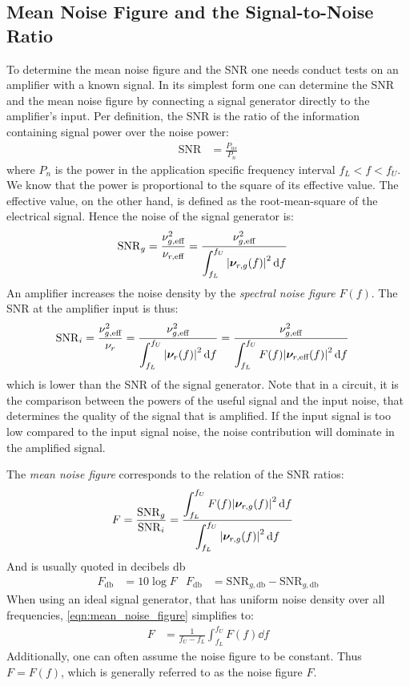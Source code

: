 \subsection{Mean Noise Figure and the Signal-to-Noise Ratio}
To determine the mean noise figure and the \acf{SNR} one needs conduct tests on an amplifier with a known signal. In its simplest form one can determine the \ac{SNR} and the mean noise figure by connecting a signal generator directly to the amplifier's input. Per definition, the \ac{SNR} is the ratio of the information containing signal power over the noise power:
\begin{align}
  \mathrm{SNR} &= \frac{P_{us}}{P_n}
\end{align}
where $P_n$ is the power in the application specific frequency interval $f_L<f<f_U$. We know that the power is proportional to the square of its effective value. The effective value, on the other hand, is defined as the root-mean-square of the electrical signal. Hence the noise of the signal generator is:
\begin{align}
  \mathrm{SNR}_g &= \frac{\nu_{g,\text{eff}}^2}{\nu_{r,\text{eff}}} = \frac{\nu_{g,\text{eff}}^2}{\displaystyle\int_{f_L}^{f_U} \abs{\bm{\nu}_{r,g}(f)}^2 \dd{f}} \label{eqn:snr_g}
\end{align}
An amplifier increases the noise density by the \emph{spectral noise figure} $F(f)$. The \ac{SNR} at the amplifier input is thus:
\begin{align}
  \mathrm{SNR}_i &= \frac{\nu_{g,\text{eff}}^2}{\nu_r} = \frac{\nu_{g,\text{eff}}^2}{\displaystyle\int_{f_L}^{f_U} \abs{\bm{\nu}_r(f)}^2 \dd{f}} = \frac{\nu_{g,\text{eff}}^2}{\displaystyle\int_{f_L}^{f_U} F(f)\abs{\bm{\nu}_{r,\text{eff}}(f)}^2 \dd{f}} \label{eqn:snr_i}
\end{align}
which is lower than the \ac{SNR} of the signal generator. Note that in a circuit, it is the comparison between the powers of the useful signal and the input noise, that determines the quality of the signal that is amplified. If the input signal is too low compared to the input signal noise, the noise contribution will dominate in the amplified signal.

The \emph{mean noise figure} corresponds to the relation of the \ac{SNR} ratios:
\begin{align}
  F &= \frac{\mathrm{SNR}_g}{\mathrm{SNR}_i} = \frac{\displaystyle \int_{f_L}^{f_U} F(f)\abs{\bm{\nu}_{r,g}(f)}^2 \dd{f}}{\displaystyle \int_{f_L}^{f_U} \abs{\bm{\nu}_{r,g}(f)}^2 \dd{f}} \label{eqn:mean_noise_figure}
\end{align}
And is usually quoted in decibels \si{\decibel}
\begin{align}
  F_{\si{\decibel}} &= 10\log F &F_{\si{\decibel}} &= \mathrm{SNR}_{g,\si{\decibel}} - \mathrm{SNR}_{g,\si{\decibel}}
\end{align}
When using an ideal signal generator, that has uniform noise density over all frequencies, \eqref{eqn:mean_noise_figure} simplifies to:
\begin{align}
  F &= \frac{1}{f_U-f_L}\int_{f_L}^{f_U} F(f)\dd{f}
\end{align}
Additionally, one can often assume the noise figure to be constant. Thus $F=F(f)$, which is generally referred to as the noise figure $F$.

